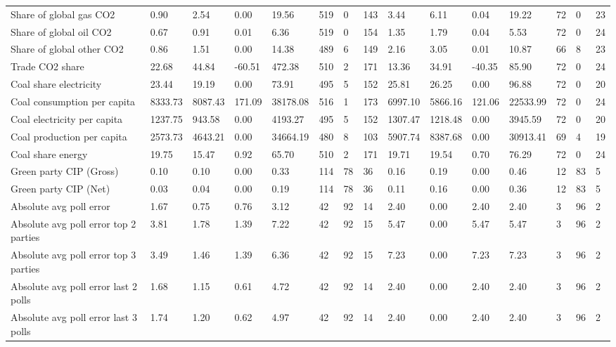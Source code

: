 \begin{longtable}{lllllllllllllll}
Share of global gas CO2 & 0.90 & 2.54 & 0.00 & 19.56 & 519 & 0 & 143 & 3.44 & 6.11 & 0.04 & 19.22 & 72 & 0 & 23\\
Share of global oil CO2 & 0.67 & 0.91 & 0.01 & 6.36 & 519 & 0 & 154 & 1.35 & 1.79 & 0.04 & 5.53 & 72 & 0 & 24\\
Share of global other CO2 & 0.86 & 1.51 & 0.00 & 14.38 & 489 & 6 & 149 & 2.16 & 3.05 & 0.01 & 10.87 & 66 & 8 & 23\\
Trade CO2 share & 22.68 & 44.84 & -60.51 & 472.38 & 510 & 2 & 171 & 13.36 & 34.91 & -40.35 & 85.90 & 72 & 0 & 24\\
\addlinespace
Coal share electricity & 23.44 & 19.19 & 0.00 & 73.91 & 495 & 5 & 152 & 25.81 & 26.25 & 0.00 & 96.88 & 72 & 0 & 20\\
Coal consumption per capita & 8333.73 & 8087.43 & 171.09 & 38178.08 & 516 & 1 & 173 & 6997.10 & 5866.16 & 121.06 & 22533.99 & 72 & 0 & 24\\
Coal electricity per capita & 1237.75 & 943.58 & 0.00 & 4193.27 & 495 & 5 & 152 & 1307.47 & 1218.48 & 0.00 & 3945.59 & 72 & 0 & 20\\
Coal production per capita & 2573.73 & 4643.21 & 0.00 & 34664.19 & 480 & 8 & 103 & 5907.74 & 8387.68 & 0.00 & 30913.41 & 69 & 4 & 19\\
Coal share energy & 19.75 & 15.47 & 0.92 & 65.70 & 510 & 2 & 171 & 19.71 & 19.54 & 0.70 & 76.29 & 72 & 0 & 24\\
\addlinespace
Green party CIP (Gross) & 0.10 & 0.10 & 0.00 & 0.33 & 114 & 78 & 36 & 0.16 & 0.19 & 0.00 & 0.46 & 12 & 83 & 5\\
Green party CIP (Net) & 0.03 & 0.04 & 0.00 & 0.19 & 114 & 78 & 36 & 0.11 & 0.16 & 0.00 & 0.36 & 12 & 83 & 5\\
Absolute avg poll error & 1.67 & 0.75 & 0.76 & 3.12 & 42 & 92 & 14 & 2.40 & 0.00 & 2.40 & 2.40 & 3 & 96 & 2\\
Absolute avg poll error top 2 parties & 3.81 & 1.78 & 1.39 & 7.22 & 42 & 92 & 15 & 5.47 & 0.00 & 5.47 & 5.47 & 3 & 96 & 2\\
Absolute avg poll error top 3 parties & 3.49 & 1.46 & 1.39 & 6.36 & 42 & 92 & 15 & 7.23 & 0.00 & 7.23 & 7.23 & 3 & 96 & 2\\
\addlinespace
Absolute avg poll error last 2 polls & 1.68 & 1.15 & 0.61 & 4.72 & 42 & 92 & 14 & 2.40 & 0.00 & 2.40 & 2.40 & 3 & 96 & 2\\
Absolute avg poll error last 3 polls & 1.74 & 1.20 & 0.62 & 4.97 & 42 & 92 & 14 & 2.40 & 0.00 & 2.40 & 2.40 & 3 & 96 & 2\\

\end{longtable}
